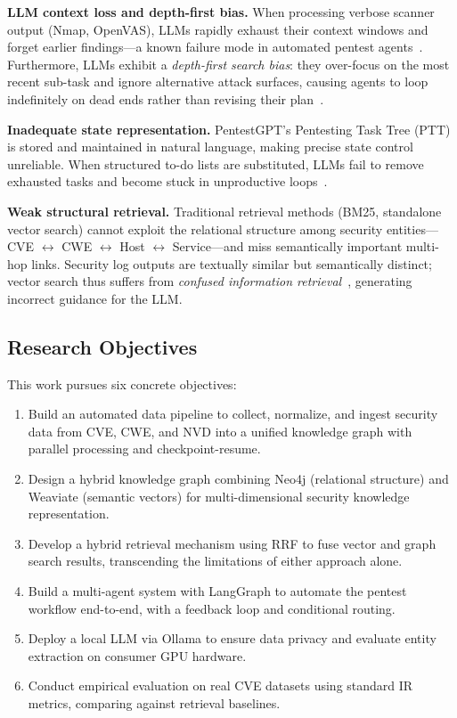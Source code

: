 \documentclass[conference]{IEEEtran}
\begin{document}
\textbf{LLM context loss and depth-first bias.}
When processing verbose scanner output (Nmap, OpenVAS), LLMs rapidly exhaust
their context windows and forget earlier findings—a known failure mode in
automated pentest agents~\cite{autopenbench2024}.
Furthermore, LLMs exhibit a \emph{depth-first search bias}: they over-focus on
the most recent sub-task and ignore alternative attack surfaces, causing agents
to loop indefinitely on dead ends rather than revising their
plan~\cite{llmbench2024}.

\textbf{Inadequate state representation.}
PentestGPT's Pentesting Task Tree (PTT) is stored and maintained in natural
language, making precise state control unreliable.
When structured to-do lists are substituted, LLMs fail to remove exhausted tasks
and become stuck in unproductive loops~\cite{llmbench2024}.

\textbf{Weak structural retrieval.}
Traditional retrieval methods (BM25, standalone vector search) cannot exploit
the relational structure among security entities—CVE $\leftrightarrow$ CWE
$\leftrightarrow$ Host $\leftrightarrow$ Service—and miss semantically important
multi-hop links.
Security log outputs are textually similar but semantically distinct; vector
search thus suffers from \emph{confused information retrieval}~\cite{deng2024pentestgpt},
generating incorrect guidance for the LLM.

\subsection{Research Objectives}

This work pursues six concrete objectives:
\begin{enumerate}
  \item Build an automated data pipeline to collect, normalize, and ingest
        security data from CVE, CWE, and NVD into a unified knowledge graph
        with parallel processing and checkpoint-resume.
  \item Design a hybrid knowledge graph combining Neo4j (relational structure)
        and Weaviate (semantic vectors) for multi-dimensional security knowledge
        representation.
  \item Develop a hybrid retrieval mechanism using RRF to fuse vector and graph
        search results, transcending the limitations of either approach alone.
  \item Build a multi-agent system with LangGraph to automate the pentest
        workflow end-to-end, with a feedback loop and conditional routing.
  \item Deploy a local LLM via Ollama to ensure data privacy and evaluate entity
        extraction on consumer GPU hardware.
  \item Conduct empirical evaluation on real CVE datasets using standard IR
        metrics, comparing against retrieval baselines.
\end{enumerate}
\end{document}
